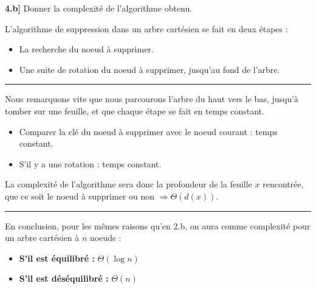 \documentclass[a4paper,12pt]{report}
\begin{document}

\newpage
{}

\textbf{4.b]} Donner la complexité de l'algorithme obtenu.



\begin{tcolorbox}[colback=gray!10, colframe=blue!30, coltitle=black, title=Réponse à la 4.b - 1/1]

    L'algorithme de suppression dans un arbre cartésien se fait en deux étapes :\\[-0.4cm]
    \begin{itemize}
        \item La recherche du noeud à supprimer.
        \item Une suite de rotation du noeud à supprimer, jusqu'au fond de l'arbre.
    \end{itemize}

    \vspace{0.5cm}
    \hrule
    \vspace{0.5cm}

    Nous remarquons vite que nous parcourons l'arbre du haut vers le bas, jusqu'à tomber sur une feuille, et que chaque étape se fait en temps constant.\\[-0.4cm]
    \begin{itemize}
        \item Comparer la clé du noeud à supprimer avec le noeud courant : temps constant.
        \item S'il y a une rotation : temps constant.
    \end{itemize}

    \vspace{0.5cm}

    La complexité de l'algorithme sera donc la profondeur de la feuille \( x \) rencontrée, que ce soit le noeud à supprimer ou non \( \Rightarrow \Theta(d(x)) \).

    \vspace{0.5cm}
    \hrule
    \vspace{0.5cm}

    En conclusion, pour les mêmes raisons qu'en 2.b, on aura comme complexité pour un arbre cartésien à \( n \) noeuds :\\[-0.4cm]
    \begin{itemize}
        \item \textbf{S'il est équilibré :} \( \Theta(\log n) \)
        \item \textbf{S'il est déséquilibré :} \( \Theta(n) \)
    \end{itemize}

\end{tcolorbox}
\end{document}
